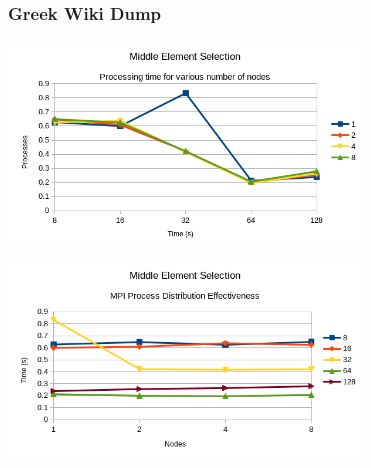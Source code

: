 \documentclass[11pt]{article}
\begin{document}
\subsubsection{Greek Wiki Dump}
\label{sec:org60ecbef}
\begin{center}
\includegraphics[height=200]{./charts/greek-wiki-dump/processing-time-nodes.png}
\end{center}
\begin{center}
\includegraphics[height=200]{./charts/greek-wiki-dump/process-distribution-effectiveness.png}
\end{center}
\end{document}
